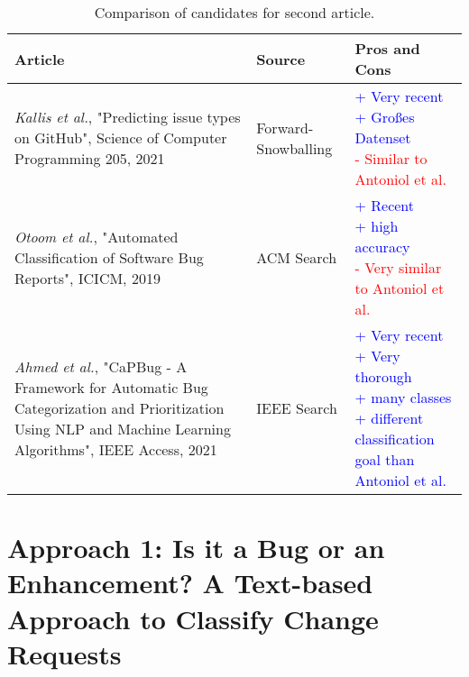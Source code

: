 \begin{table} [h] 
\centering
\begin{small}
\setlength{\tabcolsep}{1em}
\caption{Comparison of candidates for second article.}
\label{tab:LitComp}
\begin{tabular}{ p{5cm}| p{2cm}|l}
\hline
 \textbf{Article} & \textbf{ Source} & \textbf{Pros and Cons}\\
\hline
 \hline	
  \textit{Kallis et al.}, "Predicting issue types on GitHub", Science of Computer Programming 205, 2021 &Forward-Snowballing & \thead[l]{\textcolor{blue}{+ Very recent}\\ \textcolor{blue}{+ Großes Datenset} \\ \textcolor{red}{- Similar to Antoniol et al.}}\\
 \hline
  \textit{Otoom et al.}, "Automated Classification of Software Bug Reports", ICICM, 2019 & ACM Search & \thead[l]{\textcolor{blue}{+ Recent}\\ \textcolor{blue}{+ high accuracy} \\ \textcolor{red}{- Very similar to Antoniol et al.}}\\
 \hline
  \textit{Ahmed et al.}, "CaPBug - A Framework for Automatic Bug Categorization and Prioritization Using NLP and Machine Learning Algorithms", IEEE Access, 2021 & IEEE Search & \thead[l]{\textcolor{blue}{+ Very recent} \\ \textcolor{blue}{+ Very thorough} \\ \textcolor{blue}{+ many classes} \\ \textcolor{blue}{+ different classification goal than}\\ \textcolor{blue}{Antoniol et al.}}\\
 \hline
\end{tabular}
\end{small}
\end{table}

\section{Approach 1: Is it a Bug or an Enhancement? A Text-based Approach to Classify Change Requests}
